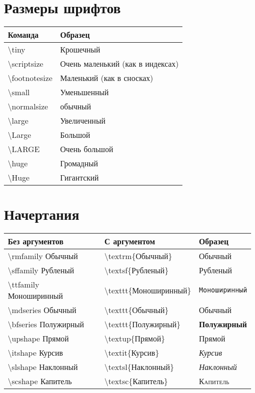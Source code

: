 \documentclass[12pt]{article}
\begin{document}
\section{Размеры шрифтов}

\begin{tabular}{|l|l|}
\hline
\bfseries Команда & \bfseries Образец \\
\hline
\textbackslash tiny & \tiny\strut Крошечный \\
\textbackslash scriptsize & \scriptsize\strut Очень маленький (как в индексах) \\
\textbackslash footnotesize & \footnotesize\strut Маленький (как в сносках) \\
\textbackslash small & \small\strut Уменьшенный \\
\textbackslash normalsize & \normalsize\strut обычный \\
\textbackslash large & \large\strut Увеличенный \\
\textbackslash Large & \Large\strut Большой \\
\textbackslash LARGE & \LARGE\strut Очень большой \\
\textbackslash huge & \huge\strut Громадный \\
\textbackslash Huge & \Huge\strut Гигантский \\
\hline
\end{tabular}


\section{Начертания}

\begin{tabular}{|l|l|l|}
\hline
\bfseries Без аргументов & \bfseries С аргументом & \bfseries Образец \\
\hline
\textbackslash rmfamily Обычный & \textbackslash textrm\{Обычный\} & \textrm{Обычный} \\
\textbackslash sffamily Рубленый & \textbackslash textsf\{Рубленый\} & \textsf{Рубленый} \\
\textbackslash ttfamily Моноширинный & \textbackslash texttt\{Моноширинный\} & \texttt{Моноширинный} \\
\textbackslash mdseries Обычный & \textbackslash texttt\{Обычный\} & \textmd{Обычный} \\
\textbackslash bfseries Полужирный & \textbackslash texttt\{Полужирный\} & \textbf{Полужирный} \\
\textbackslash upshape Прямой & \textbackslash textup\{Прямой\} & \textup{Прямой} \\
\textbackslash itshape Курсив & \textbackslash textit\{Курсив\} & \textit{Курсив} \\
\textbackslash slshape Наклонный & \textbackslash textsl\{Наклонный\} & \textsl{Наклонный} \\
\textbackslash scshape Капитель & \textbackslash textsc\{Капитель\} & \textsc{Капитель} \\
\hline
\end{tabular}
\end{document}
